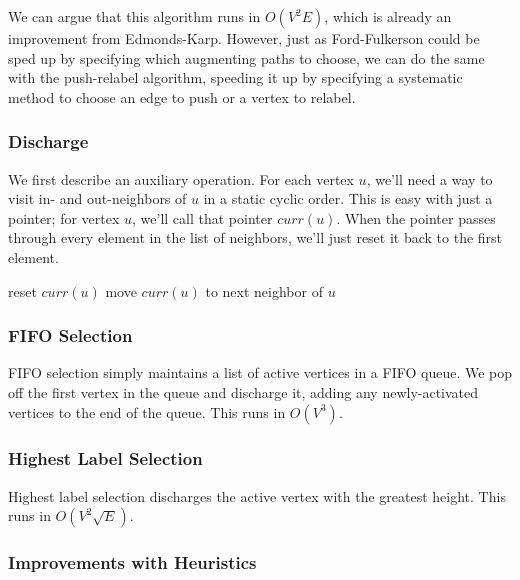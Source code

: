 We can argue that this algorithm runs in $O(V^2E)$, which is already an improvement from Edmonds-Karp. However, just as Ford-Fulkerson could be sped up by specifying which augmenting paths to choose, we can do the same with the push-relabel algorithm, speeding it up by specifying a systematic method to choose an edge to push or a vertex to relabel.

\subsubsection{Discharge}

We first describe an auxiliary operation. For each vertex $u$, we'll need a way to visit in- and out-neighbors of $u$ in a static cyclic order. This is easy with just a pointer; for vertex $u$, we'll call that pointer $curr(u)$. When the pointer passes through every element in the list of neighbors, we'll just reset it back to the first element.

\noindent \begin{minipage}{\textwidth}
\begin{algorithmic}
			\State {}
			\State reset $curr(u)$
		\Else
				\State {}
			\Else
				\State move $curr(u)$ to next neighbor of $u$
			\EndIf
		\EndIf
	\EndWhile
\EndFunction
\end{algorithmic}
\end{minipage}

\subsubsection{FIFO Selection}

FIFO selection simply maintains a list of active vertices in a FIFO queue. We pop off the first vertex in the queue and discharge it, adding any newly-activated vertices to the end of the queue. This runs in $O(V^3)$.

\subsubsection{Highest Label Selection}

Highest label selection discharges the active vertex with the greatest height. This runs in $O(V^2\sqrt{E})$.

\subsubsection{Improvements with Heuristics}

